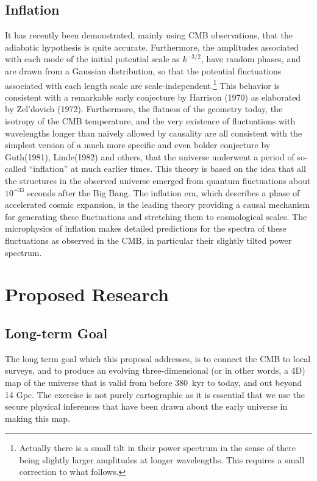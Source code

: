 \documentclass[psfig,11pt]{article}
\begin{document}
\subsection{Inflation}

It has recently been demonstrated, mainly using CMB observations, that the adiabatic hypothesis is quite accurate. Furthermore, the amplitudes associated with each mode of the initial potential scale as $k^{-3/2}$, have random phases, and are drawn from a Gaussian distribution, so that the potential fluctuations associated with each length scale are scale-independent.\footnote{Actually there is a small tilt in their power spectrum in the sense of there being slightly larger amplitudes at longer wavelengths. This requires a small correction to what follows.} This behavior is consistent with a remarkable early conjecture by Harrison (1970) as elaborated by Zel'dovich (1972). Furthermore, the flatness of the geometry today, the isotropy of the CMB temperature, and the very existence of fluctuations with wavelengths longer than naively allowed by causality are all consistent with the simplest version of a much more specific and even bolder conjecture by Guth(1981), Linde(1982) and others, that the universe underwent a period of so-called ``inflation'' at much earlier times. This theory is based on the idea that all the structures in the observed universe emerged from quantum fluctuations about $10^{-33}$ seconds after the Big Bang. The inflation era, which describes a phase of accelerated cosmic expansion, is the leading theory providing a causal mechanism for generating these fluctuations and stretching them to cosmological scales. The microphysics of inflation makes detailed predictions for the spectra of these fluctuations as observed in the CMB, in particular their slightly tilted power spectrum.



\section{Proposed Research}

\subsection{Long-term Goal}

The long term goal which this proposal addresses, is to connect the CMB to local surveys, and to produce an evolving three-dimensional (or in other words, a 4D) map of the universe that is valid from before 380~kyr to today, and out beyond 14 Gpc. The exercise is not purely cartographic as it is essential that we use the secure physical inferences that have been drawn about the early universe in making this map.
\end{document}
